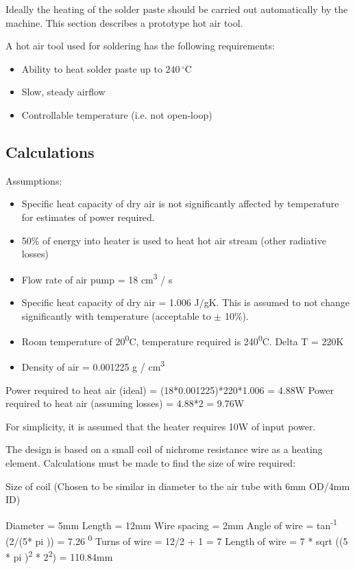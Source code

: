 Ideally the heating of the solder paste should be carried out automatically by the machine. This section describes a prototype hot air tool.

A hot air tool used for soldering has the following requirements:

\begin{itemize} \itemsep0em
	\item	Ability to heat solder paste up to $240\,^{\circ}\mathrm{C}$
	\item	Slow, steady airflow
	\item	Controllable temperature (i.e. not open-loop)
\end{itemize}

\subsection{Calculations}

Assumptions:
\begin{itemize} \itemsep0em
	\item Specific heat capacity of dry air is not significantly affected by temperature for estimates of power required.
	\item 50\% of energy into heater is used to heat hot air stream (other radiative losses)
	\item Flow rate of air pump = 18 cm\textsuperscript{3} / s
	\item Specific heat capacity of dry air = 1.006 J/gK. This is assumed to not change significantly with temperature (acceptable to $\pm$ 10\%).
	\item Room temperature of 20\textsuperscript{0}C, temperature required is 240\textsuperscript{0}C. Delta T = 220K
	\item Density of air = 0.001225 g / cm\textsuperscript{3}
\end{itemize}

Power required to heat air (ideal) = (18*0.001225)*220*1.006 = 4.88W
Power required to heat air (assuming losses) = 4.88*2 = 9.76W

For simplicity, it is assumed that the heater requires 10W of input power.

The design is based on a small coil of nichrome resistance wire as a heating element. Calculations must be made to find
the size of wire required:

Size of coil (Chosen to be similar in diameter to the air tube with 6mm OD/4mm ID)

Diameter = 5mm
Length = 12mm
Wire spacing = 2mm
Angle of wire = tan\textsuperscript{-1} (2/(5* pi )) = 7.26 \textsuperscript{0}
Turns of wire = 12/2 + 1 = 7
Length of wire = 7 * sqrt ((5 * pi )\textsuperscript{2}  * 2\textsuperscript{2}) =  110.84mm

